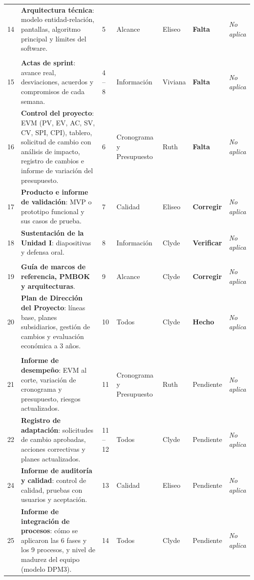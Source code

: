 \documentclass[11pt,a4paper]{article}
\newcommand{\hecho}{\textcolor{VerdeOK}{\textbf{Hecho}}}
\newcommand{\corregir}{\textcolor{DoradoFIEI}{\textbf{Corregir}}}
\newcommand{\falta}{\textcolor{RojoAlerta}{\textbf{Falta}}}
\newcommand{\pendiente}{\textcolor{GrisOscuro}{Pendiente}}
\newcommand{\verificar}{\textcolor{DoradoFIEI}{\textbf{Verificar}}}
\newcommand{\noaplica}{\textcolor{GrisOscuro}{\textit{No aplica}}}
\begin{document}
{\begin{longtable}{@{}C{0.7cm} >{\raggedright\arraybackslash}p{6.55cm} C{1.0cm} P{2.25cm} P{1.35cm} C{1.7cm} C{1.7cm}@{}}
14 & \textbf{Arquitectura técnica}: modelo entidad-relación, pantallas, algoritmo principal y límites del software. & 5 & Alcance & Eliseo & \falta & \noaplica \\
%
 \\
15 & \textbf{Actas de sprint}: avance real, desviaciones, acuerdos y compromisos de cada semana. & 4 -- 8 & Información & Viviana & \falta & \noaplica \\
16 & \textbf{Control del proyecto}: EVM (PV, EV, AC, SV, CV, SPI, CPI), tablero, solicitud de cambio con análisis de impacto, registro de cambios e informe de variación del presupuesto. & 6 & Cronograma y Presupuesto & Ruth & \falta & \noaplica \\
17 & \textbf{Producto e informe de validación}: MVP o prototipo funcional y sus casos de prueba. & 7 & Calidad & Eliseo & \corregir & \noaplica \\
18 & \textbf{Sustentación de la Unidad I}: diapositivas y defensa oral. & 8 & Información & Clyde & \verificar & \noaplica \\
%
 \\
19 & \textbf{Guía de marcos de referencia, PMBOK y arquitecturas}. & 9 & Alcance & Clyde & \corregir & \noaplica \\
20 & \textbf{Plan de Dirección del Proyecto}: líneas base, planes subsidiarios, gestión de cambios y evaluación económica a 3 años. & 10 & Todos & Clyde & \hecho & \noaplica \\
 \\
21 & \textbf{Informe de desempeño}: EVM al corte, variación de cronograma y presupuesto, riesgos actualizados. & 11 & Cronograma y Presupuesto & Ruth & \pendiente & \noaplica \\
22 & \textbf{Registro de adaptación}: solicitudes de cambio aprobadas, acciones correctivas y planes actualizados. & 11 -- 12 & Todos & Clyde & \pendiente & \noaplica \\
24 & \textbf{Informe de auditoría y calidad}: control de calidad, pruebas con usuarios y aceptación. & 13 & Calidad & Eliseo & \pendiente & \noaplica \\
25 & \textbf{Informe de integración de procesos}: cómo se aplicaron las 6 fases y los 9 procesos, y nivel de madurez del equipo (modelo DPM3). & 14 & Todos & Clyde & \pendiente & \noaplica \\

\end{longtable}}
\end{document}
